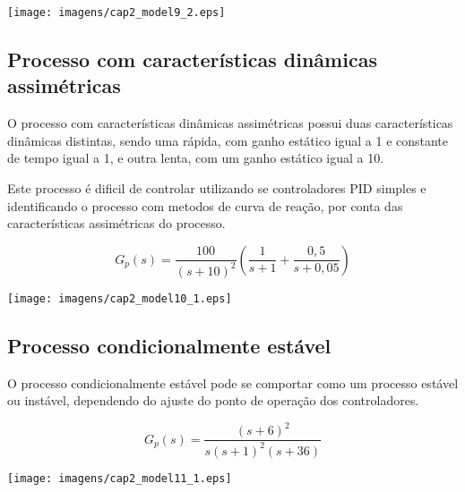     \begin{center}
        \texttt{[image: imagens/cap2\_model9\_2.eps]}
    \end{center}

\subsection{Processo com características dinâmicas assimétricas}
    
    O processo com características dinâmicas assimétricas possui duas características
    dinâmicas distintas, sendo uma rápida, com ganho estático igual a 1 e constante
    de tempo igual a 1, e outra lenta, com um ganho estático igual a 10.
    
    Este processo é dificil de controlar utilizando se controladores \acs{PID}
    simples e identificando o processo com metodos de curva de reação, por conta das
    características assimétricas do processo.
    
    \begin{equation}
        G_p(s) = \frac{100}{(s+10)^2}\left ( \frac{1}{s+1} + \frac{0,5}{s+0,05} \right )
    \end{equation}
    
    \begin{center}
        \texttt{[image: imagens/cap2\_model10\_1.eps]}
    \end{center}

\subsection{Processo condicionalmente estável}
    
    O processo condicionalmente estável pode se comportar como um processo estável
    ou instável, dependendo do ajuste do ponto de operação dos controladores.
    
    \begin{equation}
        G_p(s) = \frac{(s+6)^2}{s(s+1)^2 (s+36)}
    \end{equation}
    
    \begin{center}
        \texttt{[image: imagens/cap2\_model11\_1.eps]}
    \end{center}

